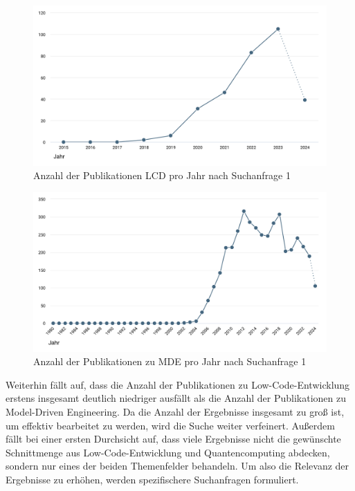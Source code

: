 \begin{figure}[h!]
    \centering
    \includegraphics[width=1\textwidth]{graphics/lcd_publications_over_years.png}
    \caption{Anzahl der Publikationen LCD pro Jahr nach Suchanfrage 1}
    \label{fig:publications_lcd_per_year}
\end{figure}

\begin{figure}[h!]
    \centering
    \includegraphics[width=1\textwidth]{graphics/mde_publications_over_years.png}
    \caption{Anzahl der Publikationen zu MDE pro Jahr nach Suchanfrage 1}
    \label{fig:publications_mde_per_year}
\end{figure}

Weiterhin fällt auf, dass die Anzahl der Publikationen zu Low-Code-Entwicklung erstens insgesamt deutlich niedriger ausfällt 
als die Anzahl der Publikationen zu Model-Driven Engineering. Da die Anzahl der Ergebnisse insgesamt zu groß ist, um effektiv 
bearbeitet zu werden, wird die Suche weiter verfeinert. Außerdem fällt bei einer ersten Durchsicht auf, dass viele Ergebnisse nicht die 
gewünschte Schnittmenge aus Low-Code-Entwicklung und Quantencomputing abdecken, sondern 
nur eines der beiden Themenfelder behandeln. Um also die Relevanz der Ergebnisse zu erhöhen, 
werden spezifischere Suchanfragen formuliert. 

